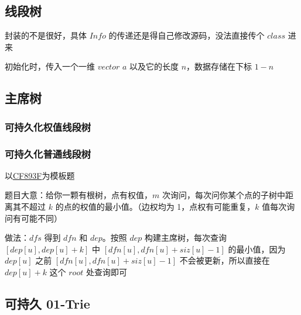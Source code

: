 \documentclass[12pt]{article}
\begin{document}
\newpage

\subsection{线段树}

封装的不是很好，具体 $Info$ 的传递还是得自己修改源码，没法直接传个 $class$ 进来

初始化时，传入一个一维 $vector$ $a$ 以及它的长度 $n$，数据存储在下标 $1-n$



\newpage

\subsection{主席树}

\subsubsection{可持久化权值线段树}



\newpage

\subsubsection{可持久化普通线段树}

以\href{http://codeforces.com/problemset/problem/893/F}{CF893F}为模板题

题目大意：给你一颗有根树，点有权值，$m$ 次询问，每次问你某个点的子树中距离其不超过 $k$ 的点的权值的最小值。（边权均为 1，点权有可能重复，$k$ 值每次询问有可能不同）

做法：$dfs$ 得到 $dfn$ 和 $dep$。按照 $dep$ 构建主席树，每次查询 $[dep[u],dep[u]+k]$ 中 $[dfn[u],dfn[u]+siz[u]-1]$ 的最小值，因为 $dep[u]$ 之前 $[dfn[u],dfn[u]+siz[u]-1]$ 不会被更新，所以直接在 $dep[u]+k$ 这个 $root$ 处查询即可



\newpage

\subsection{可持久 01-Trie}


\end{document}
